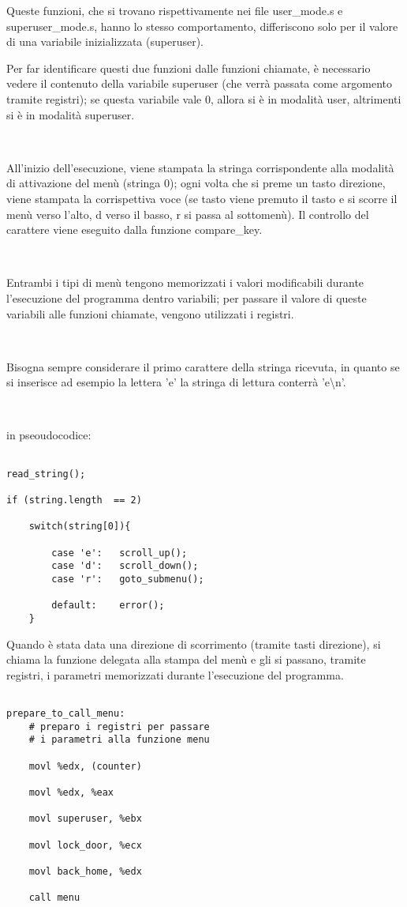 \documentclass[a4paper,titlepage]{book}
\begin{document}
Queste funzioni, che si trovano rispettivamente nei file user\_mode.s e superuser\_mode.s, hanno lo stesso comportamento, differiscono solo per il valore di una variabile inizializzata (superuser).

Per far identificare questi due funzioni dalle funzioni chiamate, è necessario vedere il contenuto della variabile superuser (che verrà passata come argomento tramite registri); se questa variabile vale 0, allora si è in modalità user, altrimenti si è in modalità superuser. 

~

All'inizio dell'esecuzione, viene stampata la stringa corrispondente alla modalità di attivazione del menù (stringa 0); ogni volta che si preme un tasto direzione, viene stampata la corrispettiva voce (se tasto viene premuto il tasto e si scorre il menù verso l'alto, d verso il basso, r si passa al sottomenù). Il controllo del carattere viene eseguito dalla funzione compare\_key.

~

Entrambi i tipi di menù tengono memorizzati i valori modificabili durante l'esecuzione del programma dentro variabili; per passare il valore di queste variabili alle funzioni chiamate, vengono utilizzati i registri.


~

Bisogna sempre considerare il primo carattere della stringa ricevuta, in quanto se si inserisce ad esempio la lettera 'e' la stringa di lettura conterrà 'e\textbackslash n'.

~

in pseoudocodice:

\begin{lstlisting}

read_string();

if (string.length  == 2)

	switch(string[0]){

		case 'e':	scroll_up();
		case 'd':	scroll_down();
		case 'r':	goto_submenu();

		default:	error();
	}		

\end{lstlisting}

\newpage
Quando è stata data una direzione di scorrimento (tramite tasti direzione), si chiama la funzione delegata alla stampa del menù e gli si passano, tramite registri, i parametri memorizzati durante l'esecuzione del programma.


\begin{lstlisting}

prepare_to_call_menu:
	# preparo i registri per passare
	# i parametri alla funzione menu

	movl %edx, (counter)

	movl %edx, %eax

	movl superuser, %ebx

	movl lock_door, %ecx

	movl back_home, %edx

	call menu

\end{lstlisting}
\end{document}
